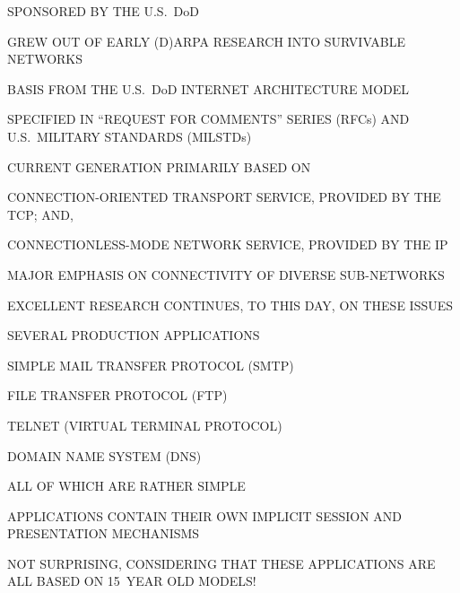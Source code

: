 \begin{bwslide}

\begin{nrtc}
\item	SPONSORED BY THE U.S.~DoD
    \begin{nrtc}
    \item	GREW OUT OF EARLY (D)ARPA RESEARCH INTO SURVIVABLE NETWORKS
    \end{nrtc}
    BASIS FROM THE U.S.~DoD INTERNET ARCHITECTURE MODEL

\item	SPECIFIED IN ``REQUEST FOR COMMENTS'' SERIES (RFCs) AND
	U.S.~MILITARY STANDARDS (MILSTDs)

\item	CURRENT GENERATION PRIMARILY BASED ON
    \begin{nrtc}
    \item	CONNECTION-ORIENTED TRANSPORT SERVICE,
		PROVIDED BY THE TCP; AND,

    \item	CONNECTIONLESS-MODE NETWORK SERVICE,
		PROVIDED BY THE IP
    \end{nrtc}

\item	MAJOR EMPHASIS ON CONNECTIVITY OF DIVERSE SUB-NETWORKS
    \begin{nrtc}
    \item	EXCELLENT RESEARCH CONTINUES, TO THIS DAY, ON THESE ISSUES
    \end{nrtc}
\end{nrtc}
\end{bwslide}


\begin{bwslide}

\begin{nrtc}
\item	SEVERAL PRODUCTION APPLICATIONS
    \begin{nrtc}
    \item	SIMPLE MAIL TRANSFER PROTOCOL (SMTP)

    \item	FILE TRANSFER PROTOCOL (FTP)

    \item	TELNET (VIRTUAL TERMINAL PROTOCOL)

    \item	DOMAIN NAME SYSTEM (DNS)
    \end{nrtc}
    ALL OF WHICH ARE RATHER SIMPLE

\item	APPLICATIONS CONTAIN THEIR OWN IMPLICIT SESSION AND PRESENTATION
	MECHANISMS

\item	NOT SURPRISING, CONSIDERING THAT THESE APPLICATIONS ARE ALL BASED ON
	15~YEAR OLD MODELS!
\end{nrtc}
\end{bwslide}


